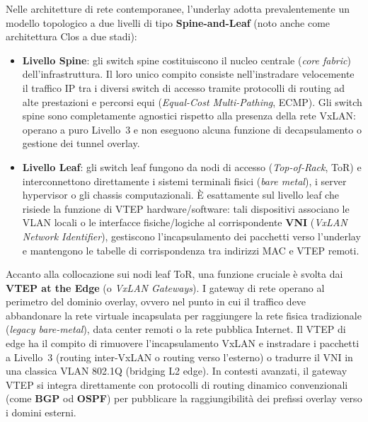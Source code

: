 \documentclass[11pt, a4paper]{article}
\begin{document}
Nelle architetture di rete contemporanee, l'underlay adotta prevalentemente un modello topologico a due livelli di tipo \textbf{Spine-and-Leaf} (noto anche come architettura Clos a due stadi):
\begin{itemize}[noitemsep]
    \item \textbf{Livello Spine}: gli switch spine costituiscono il nucleo centrale (\emph{core fabric}) dell'infrastruttura. Il loro unico compito consiste nell'instradare velocemente il traffico IP tra i diversi switch di accesso tramite protocolli di routing ad alte prestazioni e percorsi equi (\emph{Equal-Cost Multi-Pathing}, ECMP). Gli switch spine sono completamente agnostici rispetto alla presenza della rete VxLAN: operano a puro Livello~3 e non eseguono alcuna funzione di decapsulamento o gestione dei tunnel overlay.
    \item \textbf{Livello Leaf}: gli switch leaf fungono da nodi di accesso (\emph{Top-of-Rack}, ToR) e interconnettono direttamente i sistemi terminali fisici (\emph{bare metal}), i server hypervisor o gli chassis computazionali. È esattamente sul livello leaf che risiede la funzione di VTEP hardware/software: tali dispositivi associano le VLAN locali o le interfacce fisiche/logiche al corrispondente \textbf{VNI} (\emph{VxLAN Network Identifier}), gestiscono l'incapsulamento dei pacchetti verso l'underlay e mantengono le tabelle di corrispondenza tra indirizzi MAC e VTEP remoti.
\end{itemize}


Accanto alla collocazione sui nodi leaf ToR, una funzione cruciale è svolta dai \textbf{VTEP at the Edge} (o \emph{VxLAN Gateways}). I gateway di rete operano al perimetro del dominio overlay, ovvero nel punto in cui il traffico deve abbandonare la rete virtuale incapsulata per raggiungere la rete fisica tradizionale (\emph{legacy bare-metal}), data center remoti o la rete pubblica Internet. Il VTEP di edge ha il compito di rimuovere l'incapsulamento VxLAN e instradare i pacchetti a Livello~3 (routing inter-VxLAN o routing verso l'esterno) o tradurre il VNI in una classica VLAN 802.1Q (bridging L2 edge). In contesti avanzati, il gateway VTEP si integra direttamente con protocolli di routing dinamico convenzionali (come \textbf{BGP} od \textbf{OSPF}) per pubblicare la raggiungibilità dei prefissi overlay verso i domini esterni.
\end{document}
